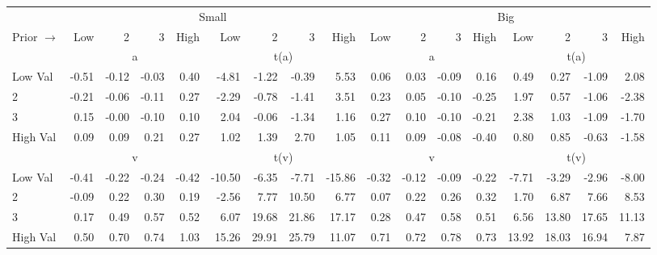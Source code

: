 

\begin{tabular}{lrrrrrrrrrrrrrrrr}
  \toprule
    & \multicolumn{8}{c}{Small} & \multicolumn{8}{c}{Big} \\
      \cmidrule(r){2-9} \cmidrule(r){10-17}
    Prior $\rightarrow$ & Low & 2 & 3 & High & Low & 2 & 3 & High & Low & 2 & 3 & High & Low & 2 & 3 & High \\ 
  \midrule

  
    
      & \multicolumn{4}{c}{a} & \multicolumn{4}{c}{t(a)}
    
      & \multicolumn{4}{c}{a} & \multicolumn{4}{c}{t(a)}
    
    \\
      \cmidrule(r){2-5} \cmidrule(r){6-9} \cmidrule(r){10-13} \cmidrule(r){14-17}

    Low Val   & -0.51  & -0.12  & -0.03  & 0.40  & -4.81  & -1.22  & -0.39  & 5.53  & 0.06  & 0.03  & -0.09  & 0.16  & 0.49  & 0.27  & -1.09  & 2.08  \\
           2  & -0.21  & -0.06  & -0.11  & 0.27  & -2.29  & -0.78  & -1.41  & 3.51  & 0.23  & 0.05  & -0.10  & -0.25  & 1.97  & 0.57  & -1.06  & -2.38  \\
           3  & 0.15  & -0.00  & -0.10  & 0.10  & 2.04  & -0.06  & -1.34  & 1.16  & 0.27  & 0.10  & -0.10  & -0.21  & 2.38  & 1.03  & -1.09  & -1.70  \\
    High Val  & 0.09  & 0.09  & 0.21  & 0.27  & 1.02  & 1.39  & 2.70  & 1.05  & 0.11  & 0.09  & -0.08  & -0.40  & 0.80  & 0.85  & -0.63  & -1.58  \\

  
    
      & \multicolumn{4}{c}{v} & \multicolumn{4}{c}{t(v)}
    
      & \multicolumn{4}{c}{v} & \multicolumn{4}{c}{t(v)}
    
    \\
      \cmidrule(r){2-5} \cmidrule(r){6-9} \cmidrule(r){10-13} \cmidrule(r){14-17}

    Low Val   & -0.41  & -0.22  & -0.24  & -0.42  & -10.50  & -6.35  & -7.71  & -15.86  & -0.32  & -0.12  & -0.09  & -0.22  & -7.71  & -3.29  & -2.96  & -8.00  \\
           2  & -0.09  & 0.22  & 0.30  & 0.19  & -2.56  & 7.77  & 10.50  & 6.77  & 0.07  & 0.22  & 0.26  & 0.32  & 1.70  & 6.87  & 7.66  & 8.53  \\
           3  & 0.17  & 0.49  & 0.57  & 0.52  & 6.07  & 19.68  & 21.86  & 17.17  & 0.28  & 0.47  & 0.58  & 0.51  & 6.56  & 13.80  & 17.65  & 11.13  \\
    High Val  & 0.50  & 0.70  & 0.74  & 1.03  & 15.26  & 29.91  & 25.79  & 11.07  & 0.71  & 0.72  & 0.78  & 0.73  & 13.92  & 18.03  & 16.94  & 7.87  \\


\end{tabular}
